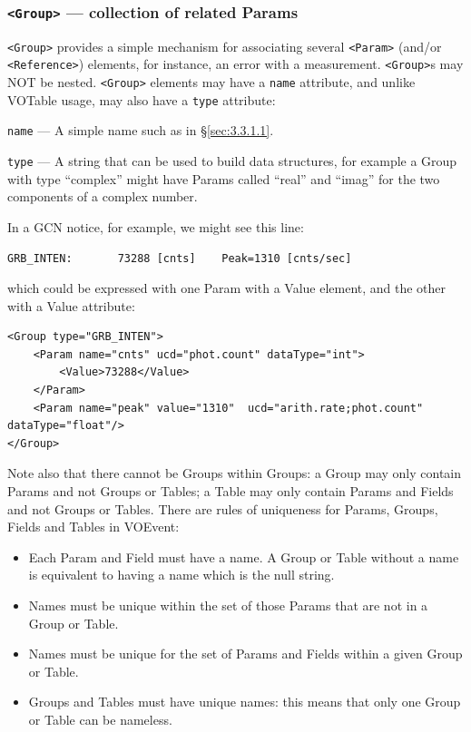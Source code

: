 \documentclass[11pt,a4paper]{ivoa}
\begin{document}
\subsubsection{{\tt <Group>} --- collection of related Params}
\label{sec:3.3.2}
{\tt <Group>} provides a simple mechanism for associating several {\tt <Param>} (and/or {\tt <Reference>}) elements, for instance, an error with a measurement. {\tt <Group>}s may NOT be nested. {\tt <Group>} elements may have a {\tt name} attribute, and unlike VOTable usage, may also have a {\tt type} attribute: 

 {\tt name}\label{sec:3.3.2.1} --- A simple name such as in \S\ref{sec:3.3.1.1}. 

 {\tt type}\label{sec:3.3.2.2} --- A string that can be used to build data structures, for example a Group with type ``complex'' might have Params called ``real'' and ``imag'' for the two components of a complex number. 

In a GCN notice, for example, we might see this line: 
{\footnotesize
\begin{verbatim}
GRB_INTEN:       73288 [cnts]    Peak=1310 [cnts/sec] 
\end{verbatim}} 
which could be expressed with one Param with a Value element, and the other with a Value attribute: 
{\footnotesize
\begin{verbatim}
<Group type="GRB_INTEN">
    <Param name="cnts" ucd="phot.count" dataType="int">
        <Value>73288</Value>
    </Param>
    <Param name="peak" value="1310"  ucd="arith.rate;phot.count" dataType="float"/>
</Group> 
\end{verbatim}}
Note also that there cannot be Groups within Groups: a Group may only contain Params and not Groups or Tables; a Table may only contain Params and Fields and not Groups or Tables. There are rules of uniqueness for Params, Groups, Fields and Tables in VOEvent: 
\begin{itemize}
\item Each Param and Field must have a name. A Group or Table without a name is equivalent to having a name which is the null string. 
\item Names must be unique within the set of those Params that are not in a Group or Table.
\item Names must be unique for the set of Params and Fields within a given Group or Table.
\item Groups and Tables must have unique names: this means that only one Group or Table can be nameless.
\end{itemize}
\end{document}
